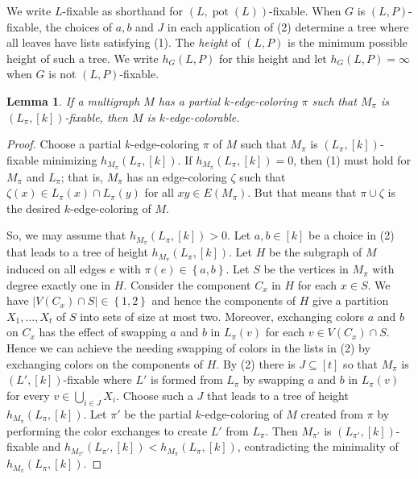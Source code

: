 \documentclass[12pt]{article}
\theoremstyle{plain}
\newtheorem{lem}[thm]{Lemma}
\theoremstyle{definition}
\theoremstyle{remark}
\newcommand{\set}[1]{\left\{ #1 \right\}}
\newcommand{\card}[1]{\left|#1\right|}
\newcommand{\irange}[1]{\left[#1\right]}
\newcommand{\parens}[1]{\left( #1 \right)}
\newcommand{\pot}{\operatorname{pot}}
\begin{document}
We write $L$-fixable as shorthand for $(L, \pot(L))$-fixable. When $G$ is $(L, P)$-fixable, the choices of $a,b$ and $J$ in each application of (2) determine a tree where all leaves have lists satisfying (1).  The \emph{height} of $(L, P)$ is the minimum possible height of such a tree.  We write $h_G(L, P)$ for this height and let $h_G(L, P) = \infty$ when $G$ is not $(L,P)$-fixable. 

\begin{lem}\label{FixableCompletesColoring}
If a multigraph $M$ has a partial $k$-edge-coloring $\pi$ such that $M_\pi$ is $(L_\pi, \irange{k})$-fixable, then $M$ is $k$-edge-colorable.
\end{lem}
\begin{proof}
Choose a partial $k$-edge-coloring $\pi$ of $M$ such that $M_\pi$ is $(L_\pi, \irange{k})$-fixable minimizing $h_{M_\pi}\parens{L_\pi, \irange{k}}$. If $h_{M_\pi}\parens{L_\pi, \irange{k}} = 0$, then (1) must hold for $M_\pi$ and $L_\pi$; that is, $M_\pi$ has an edge-coloring $\zeta$ such that $\zeta(x) \in L_\pi(x) \cap L_\pi(y)$ for all $xy \in E(M_\pi)$.  But that means that $\pi \cup \zeta$ is the desired $k$-edge-coloring of $M$.  

So, we may assume that $h_{M_\pi}\parens{L_\pi, \irange{k}} > 0$.  Let $a,b \in \irange{k}$ be a choice in (2) that leads to a tree of height $h_{M_\pi}\parens{L_\pi, \irange{k}}$.  Let $H$ be the subgraph of $M$ induced on all edges $e$ with $\pi(e) \in \set{a,b}$.  Let $S$ be the vertices in $M_\pi$ with degree exactly one in $H$.  Consider the component $C_x$ in $H$ for each $x \in S$.  We have $\card{V(C_x) \cap S} \in \set{1,2}$ and hence the components of $H$ give a partition $X_1, \ldots, X_t$ of $S$ into sets of size at most two.  Moreover, exchanging colors $a$ and $b$ on $C_x$ has the effect of swapping $a$ and $b$ in $L_\pi(v)$ for each $v \in V(C_x) \cap S$.  Hence we can achieve the needing swapping of colors in the lists in (2) by exchanging colors on the components of $H$.  By (2) there is $J \subseteq \irange{t}$ so that $M_\pi$ is $(L', \irange{k})$-fixable where $L'$ is formed from $L_\pi$ by swapping $a$ and $b$ in $L_\pi(v)$ for every $v \in \bigcup_{i \in J} X_i$.  Choose such a $J$ that leads to a tree of height $h_{M_\pi}\parens{L_\pi, \irange{k}}$.  Let $\pi'$ be the partial $k$-edge-coloring of $M$ created from $\pi$ by performing the color exchanges to create $L'$ from $L_\pi$.  Then $M_{\pi'}$ is $(L_{\pi'}, \irange{k})$-fixable and $h_{M_{\pi'}}\parens{L_{\pi'}, \irange{k}} < h_{M_\pi}\parens{L_\pi, \irange{k}}$, contradicting the minimality of $h_{M_\pi}\parens{L_\pi, \irange{k}}$.
\end{proof}
\end{document}
